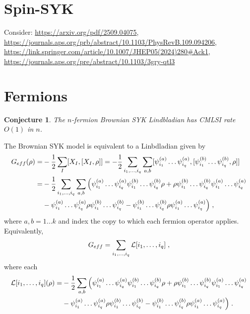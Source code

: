 \documentclass[11pt,reqno]{amsart}
\newtheorem{con}[lemma]{Conjecture}
\newcommand{\pl}{\hspace{.1cm}}
\renewcommand{\L}{\mathcal{L}}
\begin{document}
\section{Spin-SYK}
Consider: \url{https://arxiv.org/pdf/2509.04075}, \url{https://journals.aps.org/prb/abstract/10.1103/PhysRevB.109.094206}, \url{https://link.springer.com/article/10.1007/JHEP05(2024)280#Ack1}, \url{https://journals.aps.org/pre/abstract/10.1103/3gry-qtl3}

\section{Fermions}
\begin{con}
    The $n$-fermion Brownian SYK Lindbladian has CMLSI rate $O(1)$ in $n$.
\end{con}
The Brownian SYK model is equivalent to a Linbdladian given by
\begin{equation}
\begin{split}
     G_{eff}(\rho) = &  - \frac{1}{2} \sum_I [X_I, [X_I, \rho]] 
    = - \frac{1}{2} \sum_{i_1, \dots, i_q } \sum_{a,b}
        [\psi_{i_1}^{(a)} \dots \psi_{i_q}^{(a)}, [\psi_{i_1}^{(b)} \dots \psi_{i_q}^{(b)}, \rho] ]
    \\ = & - \frac{1}{2} \sum_{i_1, \dots, i_q } \sum_{a,b} \Big ( 
        \psi_{i_1}^{(a)} \dots \psi_{i_q}^{(a)} \psi_{i_1}^{(b)} \dots \psi_{i_q}^{(b)} \rho
            + \rho \psi_{i_1}^{(b)} \dots \psi_{i_q}^{(b)} \psi_{i_1}^{(a)} \dots \psi_{i_q}^{(a)}
    \\ & - \psi_{i_1}^{(a)} \dots \psi_{i_q}^{(a)} \rho  \psi_{i_1}^{(b)} \dots \psi_{i_q}^{(b)}
        -  \psi_{i_1}^{(b)} \dots \psi_{i_q}^{(b)} \rho \psi_{i_1}^{(a)} \dots \psi_{i_q}^{(a)}
    \Big ) \pl,
\end{split}
\end{equation}
where $a, b = 1 \dots k$ and index the copy to which each fermion operator applies. Equivalently,
\begin{equation}
\begin{split}
    G_{eff} = \sum_{i_1, \dots, i_q} \L[i_1, \dots, i_q] \pl,
\end{split}
\end{equation}
where each
\begin{equation}
\begin{split}
    \L[i_1, \dots, i_q](\rho) = & - \frac{1}{2} \sum_{a,b} \Big ( 
        \psi_{i_1}^{(a)} \dots \psi_{i_q}^{(a)} \psi_{i_1}^{(b)} \dots \psi_{i_q}^{(b)} \rho
            + \rho \psi_{i_1}^{(b)} \dots \psi_{i_q}^{(b)} \psi_{i_1}^{(a)} \dots \psi_{i_q}^{(a)}
    \\ & - \psi_{i_1}^{(a)} \dots \psi_{i_q}^{(a)} \rho  \psi_{i_1}^{(b)} \dots \psi_{i_q}^{(b)}
        -  \psi_{i_1}^{(b)} \dots \psi_{i_q}^{(b)} \rho \psi_{i_1}^{(a)} \dots \psi_{i_q}^{(a)}
    \Big ) \pl.
\end{split}
\end{equation}
\end{document}
